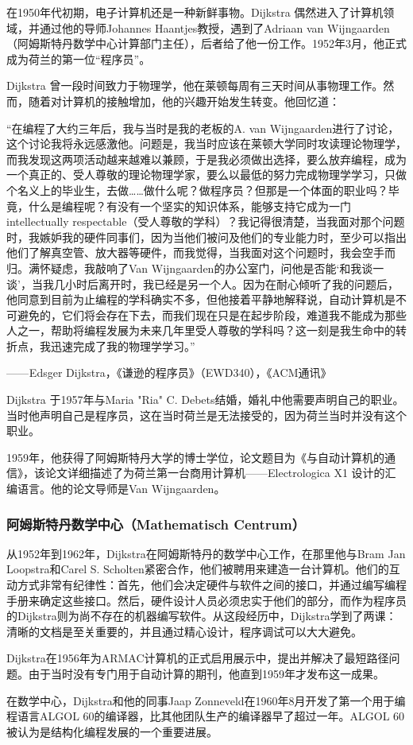 在1950年代初期，电子计算机还是一种新鲜事物。Dijkstra 偶然进入了计算机领域，并通过他的导师Johannes Haantjes教授，遇到了Adriaan van Wijngaarden（阿姆斯特丹数学中心计算部门主任），后者给了他一份工作。1952年3月，他正式成为荷兰的第一位“程序员”。  

Dijkstra 曾一段时间致力于物理学，他在莱顿每周有三天时间从事物理工作。然而，随着对计算机的接触增加，他的兴趣开始发生转变。他回忆道：  

“在编程了大约三年后，我与当时是我的老板的A. van Wijngaarden进行了讨论，这个讨论我将永远感激他。问题是，我当时应该在莱顿大学同时攻读理论物理学，而我发现这两项活动越来越难以兼顾，于是我必须做出选择，要么放弃编程，成为一个真正的、受人尊敬的理论物理学家，要么以最低的努力完成物理学学习，只做个名义上的毕业生，去做……做什么呢？做程序员？但那是一个体面的职业吗？毕竟，什么是编程呢？有没有一个坚实的知识体系，能够支持它成为一门 intellectually respectable（受人尊敬的学科）？我记得很清楚，当我面对那个问题时，我嫉妒我的硬件同事们，因为当他们被问及他们的专业能力时，至少可以指出他们了解真空管、放大器等硬件，而我觉得，当我面对这个问题时，我会空手而归。满怀疑虑，我敲响了Van Wijngaarden的办公室门，问他是否能‘和我谈一谈’，当我几小时后离开时，我已经是另一个人。因为在耐心倾听了我的问题后，他同意到目前为止编程的学科确实不多，但他接着平静地解释说，自动计算机是不可避免的，它们将会存在下去，而我们现在只是在起步阶段，难道我不能成为那些人之一，帮助将编程发展为未来几年里受人尊敬的学科吗？这一刻是我生命中的转折点，我迅速完成了我的物理学学习。”

—— Edsger Dijkstra，《谦逊的程序员》（EWD340），《ACM通讯》  

Dijkstra 于1957年与Maria "Ria" C. Debets结婚，婚礼中他需要声明自己的职业。当时他声明自己是程序员，这在当时荷兰是无法接受的，因为荷兰当时并没有这个职业。  

1959年，他获得了阿姆斯特丹大学的博士学位，论文题目为《与自动计算机的通信》，该论文详细描述了为荷兰第一台商用计算机——Electrologica X1 设计的汇编语言。他的论文导师是Van Wijngaarden。
\subsubsection{阿姆斯特丹数学中心（Mathematisch Centrum）}
从1952年到1962年，Dijkstra在阿姆斯特丹的数学中心工作，在那里他与Bram Jan Loopstra和Carel S. Scholten紧密合作，他们被聘用来建造一台计算机。他们的互动方式非常有纪律性：首先，他们会决定硬件与软件之间的接口，并通过编写编程手册来确定这些接口。然后，硬件设计人员必须忠实于他们的部分，而作为程序员的Dijkstra则为尚不存在的机器编写软件。从这段经历中，Dijkstra学到了两课：清晰的文档是至关重要的，并且通过精心设计，程序调试可以大大避免。

Dijkstra在1956年为ARMAC计算机的正式启用展示中，提出并解决了最短路径问题。由于当时没有专门用于自动计算的期刊，他直到1959年才发布这一成果。

在数学中心，Dijkstra和他的同事Jaap Zonneveld在1960年8月开发了第一个用于编程语言ALGOL 60的编译器，比其他团队生产的编译器早了超过一年。ALGOL 60被认为是结构化编程发展的一个重要进展。